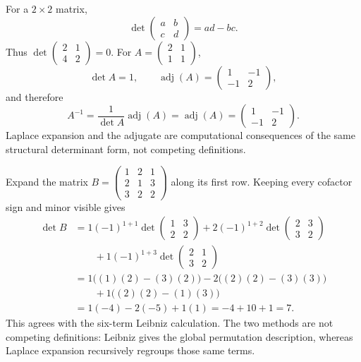 \begin{example}
For a \(2\times2\) matrix,
\[
\det\begin{pmatrix}a&b\\c&d\end{pmatrix}=ad-bc.
\]
Thus \(\det\begin{pmatrix}2&1\\4&2\end{pmatrix}=0\).  For
\(A=\begin{pmatrix}2&1\\1&1\end{pmatrix}\),
\[
\det A=1,
\qquad
\operatorname{adj}(A)=\begin{pmatrix}1&-1\\-1&2\end{pmatrix},
\]
and therefore
\[
A^{-1}=\frac{1}{\det A}\operatorname{adj}(A)
=\operatorname{adj}(A)
=\begin{pmatrix}1&-1\\-1&2\end{pmatrix}.
\]
Laplace expansion and the adjugate are computational consequences of the
same structural determinant form, not competing definitions.
\end{example}

\begin{example}
Expand the matrix
\(B=\begin{pmatrix}1&2&1\\2&1&3\\3&2&2\end{pmatrix}\)
along its first row.  Keeping every cofactor sign and minor visible gives
\[
\begin{aligned}
\det B
&=1(-1)^{1+1}\det\begin{pmatrix}1&3\\2&2\end{pmatrix}
 +2(-1)^{1+2}\det\begin{pmatrix}2&3\\3&2\end{pmatrix}\\
&\qquad
 +1(-1)^{1+3}\det\begin{pmatrix}2&1\\3&2\end{pmatrix}\\
&=1\bigl((1)(2)-(3)(2)\bigr)
-2\bigl((2)(2)-(3)(3)\bigr)\\
&\qquad
+1\bigl((2)(2)-(1)(3)\bigr)\\
&=1(-4)-2(-5)+1(1)=-4+10+1=7.
\end{aligned}
\]
This agrees with the six-term Leibniz calculation.  The two methods are not
competing definitions: Leibniz gives the global permutation description,
whereas Laplace expansion recursively regroups those same terms.
\end{example}

